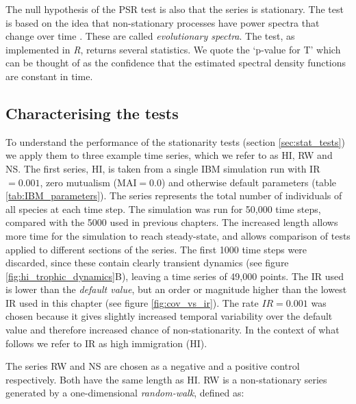The null hypothesis of the PSR test is also that the series is stationary. The test is based on the idea that non-stationary processes have power spectra that change over time \cite{priestley1969test}. These are called \emph{evolutionary spectra}. The test, as implemented in \emph{R}, returns several statistics. We quote the `p-value for T' which can be thought of as the confidence that the estimated spectral density functions are constant in time.

\subsection{Characterising the tests}
\label{sec:characterising_stat_tests}


To understand the performance of the stationarity tests (section \ref{sec:stat_tests}) we apply them to three example time series, which we refer to as HI, RW and NS. The first series, HI, is taken from a single IBM simulation run with  IR$=0.001$, zero mutualism (MAI$=0.0$) and otherwise default parameters (table \ref{tab:IBM_parameters}).  The series represents the total number of individuals of all species at each time step. The simulation was run for 50,000 time steps, compared with the 5000 used in previous chapters. The increased length allows more time for the simulation to reach steady-state, and allows comparison of tests applied to different sections of the series. The first 1000 time steps were discarded, since these contain clearly transient dynamics (see figure \ref{fig:hi_trophic_dynamics}B), leaving a time series of 49,000 points. The IR used is lower than the \emph{default value}, but an order or magnitude higher than the lowest IR used in this chapter (see figure \ref{fig:cov_vs_ir}). The rate $IR=0.001$ was chosen because it gives slightly increased temporal variability over the default value and therefore increased chance of non-stationarity. In the context of what follows we refer to IR as high immigration (HI).


The series RW and NS are chosen as a negative and a positive control respectively. Both have the same length as HI. RW is a non-stationary series generated by a one-dimensional \emph{random-walk}, defined as:

